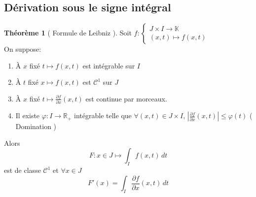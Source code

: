 \documentclass[10pt,a4paper]{article}
\theoremstyle{definition}
\newtheorem{theorem}[proposition]{Théorème}
\begin{document}
\subsection{Dérivation sous le signe intégral}
\begin{theorem}[ Formule de Leibniz ]
    Soit \(f:\begin{cases} J \times I \to \mathbb{K} \\ (x, t) \mapsto f(x, t)\end{cases}\) \\
    On suppose:
    \begin{enumerate}
        \item À \(x\) fixé \(t \mapsto f(x, t)\) est intégrable sur \(I\)
        \item À \(t\) fixé \(x \mapsto f(x, t)\) est \(\mathcal{C}^1\) sur \(J\)
        \item À \(x\) fixé \(t \mapsto \frac{\partial f}{\partial x}(x, t)\) est continue par morceaux.
        \item Il existe \(\varphi: I \to \mathbb{R}_+\) intégrable telle que \(\forall (x, t) \in J \times I\), \(\left| \frac{\partial f}{\partial x}(x, t) \right| \leq \varphi(t)\) ( Domination )
    \end{enumerate}
    Alors \[F: x \in J \mapsto \int_{I} f(x, t) \,dt\] est de classe \(\mathcal{C}^1\) et \(\forall x \in J\)
    \[F'(x) = \int_{I} \frac{\partial f}{\partial x}(x, t) \,dt\]
\end{theorem}

\pagebreak
\end{document}
